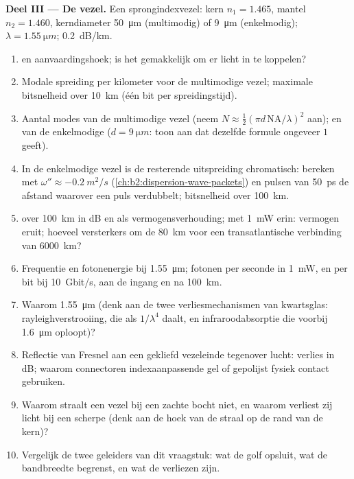 \begin{problem}
\medskip
\noindent\textbf{Deel III --- De vezel.}
Een sprongindexvezel: kern $n_1 = 1.465$, mantel $n_2 = 1.460$, kerndiameter
\qty{50}{\micro m} (multimodig) of \qty{9}{\micro m} (enkelmodig);
$\lambda = \qty{1.55}{\micro m}$;  \qty{0.2}{dB/km}.
\begin{enumerate}[resume]
  \item {} en aanvaardingshoek; is het gemakkelijk om er
        licht in te koppelen?
  \item Modale spreiding per kilometer voor de multimodige vezel; maximale
        bitsnelheid over \qty{10}{km} (één bit per spreidingstijd).
  \item Aantal modes van de multimodige vezel (neem
        $N \approx
        \tfrac12(\pi d\,\mathrm{NA}/\lambda)^2$ aan); en van de
        enkelmodige ($d =
        \qty{9}{\micro m}$: toon aan dat dezelfde formule
        ongeveer $1$ geeft).
  \item In de enkelmodige vezel is de resterende uitspreiding chromatisch:
        bereken met $\omega'' \approx \qty{-0.2}{m^2/s}$
        (\cref{ch:b2:dispersion-wave-packets}) en pulsen van \qty{50}{ps} de
        afstand waarover een puls verdubbelt; bitsnelheid over
        \qty{100}{km}.
  \item {} over \qty{100}{km} in dB en als vermogensverhouding; met
        \qty{1}{mW} erin: vermogen eruit; hoeveel versterkers om de
        \qty{80}{km} voor een transatlantische verbinding van
        \qty{6000}{km}?
  \item Frequentie en fotonenergie bij \qty{1.55}{\micro m}; fotonen per
        seconde in \qty{1}{mW}, en per bit bij \qty{10}{Gbit/s}, aan de
        ingang en na \qty{100}{km}.
  \item Waarom \qty{1.55}{\micro m} (denk aan de twee verliesmechanismen van
        kwartsglas: rayleighverstrooiing, die als $1/\lambda^4$ daalt, en
        infraroodabsorptie die voorbij \qty{1.6}{\micro m} oploopt)?
  \item Reflectie van Fresnel aan een gekliefd vezeleinde tegenover lucht:
        verlies in dB; waarom connectoren indexaanpassende gel of gepolijst
        fysiek contact gebruiken.
  \item Waarom straalt een vezel bij een zachte bocht niet, en waarom
        verliest zij licht bij een scherpe (denk aan de hoek van de straal
        op de rand van de kern)?
  \item Vergelijk de twee geleiders van dit vraagstuk: wat de golf opsluit,
        wat de bandbreedte begrenst, en wat de verliezen zijn.
\end{enumerate}
\end{problem}
